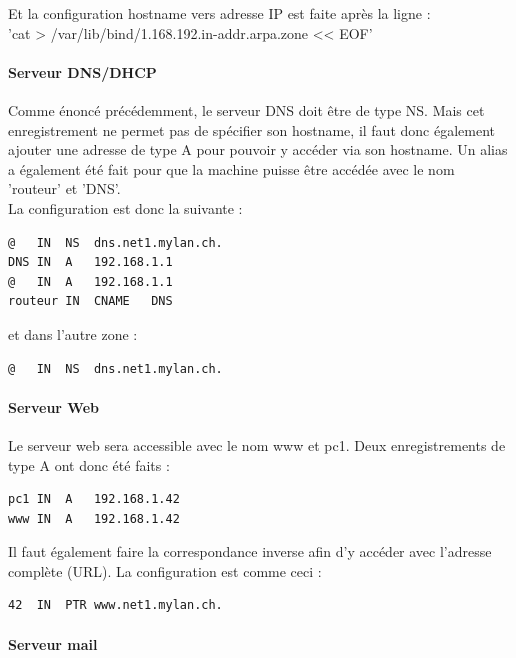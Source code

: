 \documentclass{article}
\begin{document}
Et la configuration hostname vers adresse IP est faite après la ligne :\\
 'cat > /var/lib/bind/1.168.192.in-addr.arpa.zone << EOF'

\paragraph{Serveur DNS/DHCP}

Comme énoncé précédemment, le serveur DNS doit être de type NS. Mais cet enregistrement ne permet pas de spécifier son hostname, il faut donc également ajouter une adresse de type A pour pouvoir y accéder via son hostname. Un alias a également été fait pour que la machine puisse être accédée avec le nom 'routeur' et 'DNS'.\\

La configuration est donc la suivante : 

\begin{lstlisting}
@	IN	NS	dns.net1.mylan.ch.
DNS	IN	A	192.168.1.1
@	IN	A	192.168.1.1
routeur	IN	CNAME	DNS
\end{lstlisting}

et dans l'autre zone :

\begin{lstlisting}
@	IN 	NS	dns.net1.mylan.ch.
\end{lstlisting}

\paragraph{Serveur Web}

Le serveur web sera accessible avec le nom www et pc1. Deux enregistrements de type A ont donc été faits : \\

\begin{lstlisting}
pc1	IN	A	192.168.1.42
www	IN	A	192.168.1.42
\end{lstlisting}

Il faut également faire la correspondance inverse afin d'y accéder avec l'adresse complète (URL). La configuration est comme ceci : 

\begin{lstlisting}
42	IN	PTR	www.net1.mylan.ch.
\end{lstlisting}

\paragraph{Serveur mail}
\end{document}
